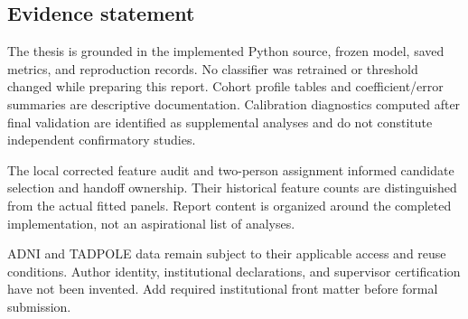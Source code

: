 \documentclass[11pt,a4paper]{article}
\begin{document}
\subsection*{Evidence statement}
The thesis is grounded in the implemented Python source, frozen model, saved metrics, and reproduction records. No classifier was retrained or threshold changed while preparing this report. Cohort profile tables and coefficient/error summaries are descriptive documentation. Calibration diagnostics computed after final validation are identified as supplemental analyses and do not constitute independent confirmatory studies.

The local corrected feature audit and two-person assignment informed candidate selection and handoff ownership. Their historical feature counts are distinguished from the actual fitted panels. Report content is organized around the completed implementation, not an aspirational list of analyses.

ADNI and TADPOLE data remain subject to their applicable access and reuse conditions. Author identity, institutional declarations, and supervisor certification have not been invented. Add required institutional front matter before formal submission.

\clearpage
\end{document}

